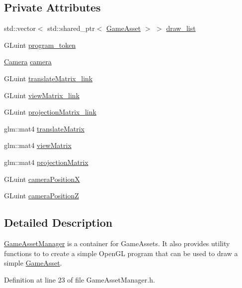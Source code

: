 \subsection*{Private Attributes}
\begin{DoxyCompactItemize}
\item 
std\+::vector$<$ std\+::shared\+\_\+ptr$<$ \hyperlink{class_game_asset}{Game\+Asset} $>$ $>$ \hyperlink{class_game_asset_manager_a671cddd92f1de4186c582fe0c4297b7d}{draw\+\_\+list}
\item 
G\+Luint \hyperlink{class_game_asset_manager_ad7bab17862e06ca692289f934b40548b}{program\+\_\+token}
\item 
\hyperlink{class_camera}{Camera} \hyperlink{class_game_asset_manager_af408912d75b4d97d29babc8850ecb8ae}{camera}
\item 
G\+Luint \hyperlink{class_game_asset_manager_a5e737710573e276ca53c683bc6731a51}{translate\+Matrix\+\_\+link}
\item 
G\+Luint \hyperlink{class_game_asset_manager_a71322a65c085d1d296e87aaddc4aea15}{view\+Matrix\+\_\+link}
\item 
G\+Luint \hyperlink{class_game_asset_manager_aa98eb0fb89a0a39e29be33294b322855}{projection\+Matrix\+\_\+link}
\item 
glm\+::mat4 \hyperlink{class_game_asset_manager_a1f0530749ec3ca5ee7925b2b70e8a8c2}{translate\+Matrix}
\item 
glm\+::mat4 \hyperlink{class_game_asset_manager_a4e702908c5d7d66e40c676d2c4f7930c}{view\+Matrix}
\item 
glm\+::mat4 \hyperlink{class_game_asset_manager_a2bc76e9ac72dcf9490436a59dc3bc752}{projection\+Matrix}
\item 
G\+Luint \hyperlink{class_game_asset_manager_a011295db68f0413a94700c5aa2778c45}{camera\+Position\+X}
\item 
G\+Luint \hyperlink{class_game_asset_manager_a076d00cef5f59a5038e168a0cc80420d}{camera\+Position\+Z}
\end{DoxyCompactItemize}


\subsection{Detailed Description}
\hyperlink{class_game_asset_manager}{Game\+Asset\+Manager} is a container for Game\+Assets. It also provides utility functions to to create a simple Open\+G\+L program that can be used to draw a simple \hyperlink{class_game_asset}{Game\+Asset}. 

Definition at line 23 of file Game\+Asset\+Manager.\+h.



